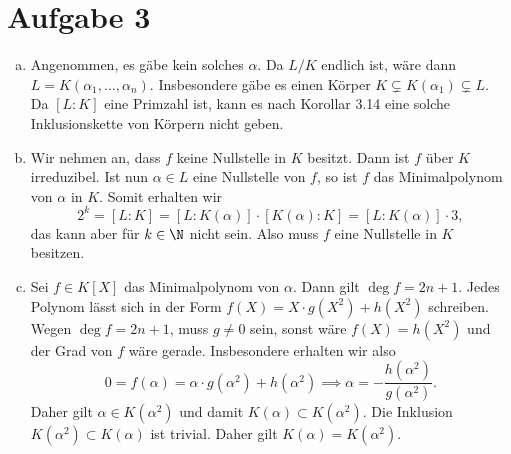 \documentclass{article}
\begin{document}
    \section*{Aufgabe 3}
    \begin{enumerate}[(a)]
        \item Angenommen, es gäbe kein solches $\alpha$. Da $L/K$ endlich ist, wäre dann $L = K(\alpha_1, \dots, \alpha_n)$. Insbesondere gäbe es einen Körper $K \subsetneq K(\alpha_1) \subsetneq L$. Da $[L\colon K]$ eine Primzahl ist, kann es nach Korollar 3.14 eine solche Inklusionskette von Körpern nicht geben.
        \item Wir nehmen an, dass $f$ keine Nullstelle in $K$ besitzt. Dann ist $f$ über $K$ irreduzibel. Ist nun $\alpha \in L$ eine Nullstelle von $f$, so ist $f$ das Minimalpolynom von $\alpha$ in $K$. Somit erhalten wir
        \[
            2^k = [L\colon K] = [L\colon K(\alpha)]\cdot [K(\alpha) \colon K] = [L\colon K(\alpha)] \cdot 3,  
        \]
        das kann aber für $k\in \N$ nicht sein. Also muss $f$ eine Nullstelle in $K$ besitzen.
        \item Sei $f \in K[X]$ das Minimalpolynom von $\alpha$. Dann gilt $\deg f = 2n + 1$. Jedes Polynom lässt sich in der Form $f(X) = X \cdot g(X^2) + h(X^2)$ schreiben. Wegen $\deg f = 2n+1$, muss $g \neq 0$ sein, sonst wäre $f(X) = h(X^2)$ und der Grad von $f$ wäre gerade. Insbesondere erhalten wir also 
        \[
            0 = f(\alpha) = \alpha \cdot g(\alpha^2) + h(\alpha^2)  \implies \alpha = -\frac{h(\alpha^2)}{g(\alpha^2)}.
        \]
        Daher gilt $\alpha \in K(\alpha^2)$ und damit $K(\alpha) \subset K(\alpha^2)$. Die Inklusion $K(\alpha^2) \subset K(\alpha)$ ist trivial. Daher gilt $K(\alpha) = K(\alpha^2)$.
    \end{enumerate}
\end{document}
